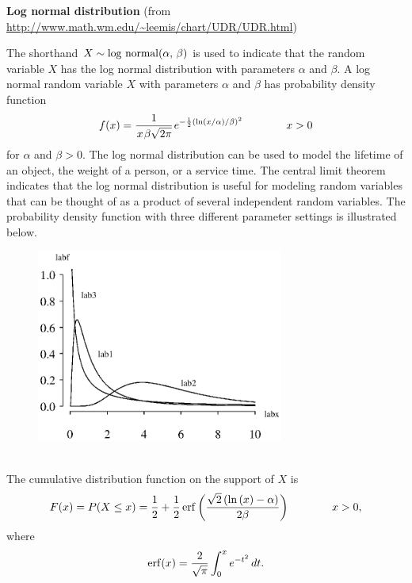\documentclass[12pt,fullpage]{article}
\begin{document}
\noindent
{\bf Log normal distribution} (from \color{blue}\url{http://www.math.wm.edu/~leemis/chart/UDR/UDR.html}\color{black})

\noindent
The shorthand $X \sim {\rm log\  normal}(\alpha,\, \beta)$ is used to indicate that the
random variable $X$ has the log normal distribution with parameters $\alpha$ and $\beta$.
A log normal random variable $X$ with parameters $\alpha$ and $\beta$ has probability density function 
$$
f(x) = \frac{1}{\kern 0.08 em x \kern 0.08 em \beta \sqrt{2\pi}} \kern 0.08 em e ^ {-\frac{1} {2}(\ln (x/ \alpha) / \beta) ^ {2}} \qquad \qquad x > 0
$$
for $\alpha$ and $\beta > 0$.  
The log normal distribution can be used to model the lifetime of an object, the weight of a person, or a service time.
The central limit theorem indicates that the log normal distribution is
useful for modeling random variables that can be thought of as a 
product of several independent random variables.
The probability density function with three different parameter settings is illustrated below.
{\begin{figure}[h!]
\begin{center}
\includegraphics[width=3.2in]{LognormalPlot.ps}
\end{center}
\end{figure}}\\
The cumulative distribution function on the support of $X$ is
$$
F(x) = P(X \le x) = \frac{1}{2} + \frac{1}{2}\,
{{\rm erf} \left({\frac {\sqrt {2} \left( \ln  \left( x \right) - \alpha  \right) }{2\beta }}\right)}
 \qquad \qquad  x > 0, 
$$
where
$$
{\rm erf}(x) = \frac{2}{\sqrt{\pi}} \int_{0} ^ {x} e ^ {-t ^ {2}} \, dt.
$$
\end{document}
